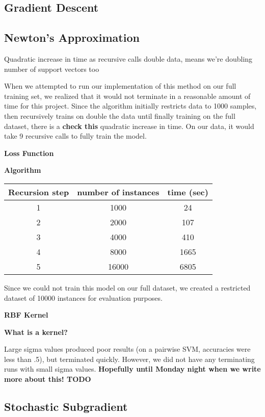 \documentclass[letterpaper, 11pt]{article}
\begin{document}
\subsection{Gradient Descent}

\subsection{Newton's Approximation}

Quadratic increase in time as recursive calls double data, means we're doubling number of support vectors too

When we attempted to run our implementation of this method on our full training set, we realized that it would not terminate in a reasonable amount of time for this project.  Since the algorithm initially restricts data to 1000 samples, then recursively trains on double the data until finally training on the full dataset, there is a \textbf{check this} quadratic increase in time.  On our data, it would take 9 recursive calls to fully train the model.

\textbf{Loss Function}

\textbf{Algorithm}

\begin{table}
\centering
\begin{tabular}{c|cc}
Recursion step & number of instances & time (sec)\\
\hline
1 & 1000 & 24\\
2 & 2000 & 107\\
3 & 4000 & 410\\
4 & 8000 & 1665\\
5 & 16000 & 6805\\
\end{tabular}
\end{table}

Since we could not train this model on our full dataset, we created a restricted dataset of 10000 instances for evaluation purposes.

\textbf{RBF Kernel}

\textbf{What is a kernel?}

Large sigma values produced poor results (on a pairwise SVM, accuracies were less than .5), but terminated quickly.  However, we did not have any terminating runs with small sigma values. \textbf{Hopefully until Monday night when we write more about this! TODO}


\subsection{Stochastic Subgradient}
\end{document}

